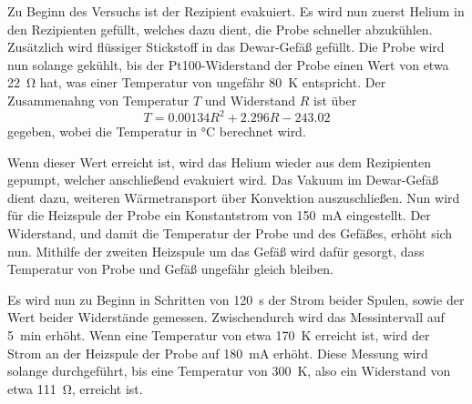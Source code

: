     Zu Beginn des Versuchs ist der Rezipient evakuiert.
    Es wird nun zuerst Helium in den Rezipienten gefüllt,
    welches dazu dient,
    die Probe schneller abzukühlen.
    Zusätzlich wird flüssiger Stickstoff in das Dewar-Gefäß gefüllt.
    Die Probe wird nun solange gekühlt,
    bis der Pt100-Widerstand der Probe einen Wert von etwa \SI{22}{\ohm} hat,
    was einer Temperatur von ungefähr \SI{80}{\kelvin} entspricht.
    Der Zusammenahng von Temperatur $T$ und Widerstand $R$ ist über
    \begin{equation}
        T = \num{0.00134} R^2 + \num{2.296} R - \num{243.02}
        \label{eqn:durchfuehrung:pt100}
    \end{equation}
    gegeben,
    wobei die Temperatur in \si{\celsius} berechnet wird.

    Wenn dieser Wert erreicht ist,
    wird das Helium wieder aus dem Rezipienten gepumpt,
    welcher anschließend evakuiert wird.
    Das Vakuum im Dewar-Gefäß dient dazu,
    weiteren Wärmetransport über Konvektion auszuschließen.
    Nun wird für die Heizspule der Probe ein Konstantstrom von \SI{150}{\milli\ampere} eingestellt.
    Der Widerstand,
    und damit die Temperatur der Probe und des Gefäßes,
    erhöht sich nun.
    Mithilfe der zweiten Heizspule um das Gefäß wird dafür gesorgt,
    dass Temperatur von Probe und Gefäß ungefähr gleich bleiben.

    Es wird nun zu Beginn in Schritten von \SI{120}{\second} der Strom beider Spulen,
    sowie der Wert beider Widerstände gemessen.
    Zwischendurch wird das Messintervall auf \SI{5}{\minute} erhöht.
    Wenn eine Temperatur von etwa \SI{170}{\kelvin} erreicht ist,
    wird der Strom an der Heizspule der Probe auf \SI{180}{\milli\ampere} erhöht.
    Diese Messung wird solange durchgeführt,
    bis eine Temperatur von \SI{300}{\kelvin},
    also ein Widerstand von etwa \SI{111}{\ohm},
    erreicht ist.

